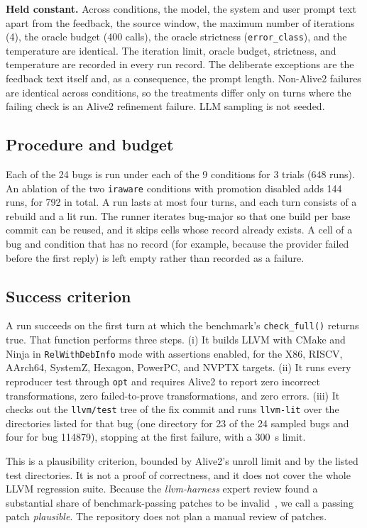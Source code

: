 \documentclass[conference]{IEEEtran}
\newcommand{\cn}[1]{\texttt{#1}}   %
\begin{document}
\textbf{Held constant.} Across conditions, the model, the system and user prompt text apart from the feedback, the source window, the maximum number of iterations (4), the oracle budget (400 calls), the oracle strictness (\cn{error\_class}), and the temperature are identical. The iteration limit, oracle budget, strictness, and temperature are recorded in every run record. The deliberate exceptions are the feedback text itself and, as a consequence, the prompt length. Non-Alive2 failures are identical across conditions, so the treatments differ only on turns where the failing check is an Alive2 refinement failure. LLM sampling is not seeded.

\subsection{Procedure and budget}

Each of the 24 bugs is run under each of the 9 conditions for 3 trials (648 runs). An ablation of the two \cn{iraware} conditions with promotion disabled adds 144 runs, for 792 in total. A run lasts at most four turns, and each turn consists of a rebuild and a lit run. The runner iterates bug-major so that one build per base commit can be reused, and it skips cells whose record already exists. A cell of a bug and condition that has no record (for example, because the provider failed before the first reply) is left empty rather than recorded as a failure.

\subsection{Success criterion}
\label{sec:success}

A run succeeds on the first turn at which the benchmark's \texttt{check\_full()} returns true. That function performs three steps. (i) It builds LLVM with CMake and Ninja in \texttt{RelWithDebInfo} mode with assertions enabled, for the X86, RISCV, AArch64, SystemZ, Hexagon, PowerPC, and NVPTX targets. (ii) It runs every reproducer test through \texttt{opt} and requires Alive2 to report zero incorrect transformations, zero failed-to-prove transformations, and zero errors. (iii) It checks out the \texttt{llvm/test} tree of the fix commit and runs \texttt{llvm-lit} over the directories listed for that bug (one directory for 23 of the 24 sampled bugs and four for bug 114879), stopping at the first failure, with a 300~s limit.

This is a plausibility criterion, bounded by Alive2's unroll limit and by the listed test directories. It is not a proof of correctness, and it does not cover the whole LLVM regression suite. Because the \emph{llvm-harness} expert review found a substantial share of benchmark-passing patches to be invalid~\cite{zheng2026harness}, we call a passing patch \emph{plausible}. The repository does not plan a manual review of patches.
\end{document}
